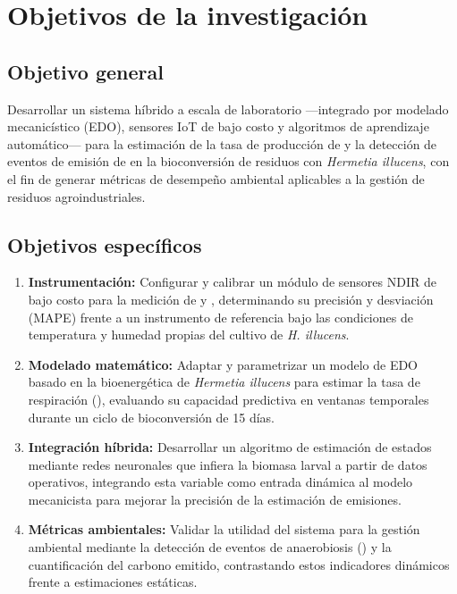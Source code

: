 \section{Objetivos de la investigación}

\subsection{Objetivo general}

Desarrollar un sistema híbrido a escala de laboratorio ---integrado por modelado mecanicístico (EDO), sensores IoT de bajo costo y algoritmos de aprendizaje automático--- para la estimación de la tasa de producción de  y la detección de eventos de emisión de  en la bioconversión de residuos con \textit{Hermetia illucens}, con el fin de generar métricas de desempeño ambiental aplicables a la gestión de residuos agroindustriales.

\subsection{Objetivos específicos}

\begin{enumerate}
    \item \textbf{Instrumentación:} Configurar y calibrar un módulo de sensores NDIR de bajo costo para la medición de  y , determinando su precisión y desviación (MAPE) frente a un instrumento de referencia bajo las condiciones de temperatura y humedad propias del cultivo de \textit{H. illucens}.
    
    \item \textbf{Modelado matemático:} Adaptar y parametrizar un modelo de EDO basado en la bioenergética de \textit{Hermetia illucens} para estimar la tasa de respiración (), evaluando su capacidad predictiva en ventanas temporales durante un ciclo de bioconversión de 15 días.
    
    \item \textbf{Integración híbrida:} Desarrollar un algoritmo de estimación de estados mediante redes neuronales que infiera la biomasa larval a partir de datos operativos, integrando esta variable como entrada dinámica al modelo mecanicista para mejorar la precisión de la estimación de emisiones.
    
    \item \textbf{Métricas ambientales:} Validar la utilidad del sistema para la gestión ambiental mediante la detección de eventos de anaerobiosis () y la cuantificación del carbono emitido, contrastando estos indicadores dinámicos frente a estimaciones estáticas.
\end{enumerate}
